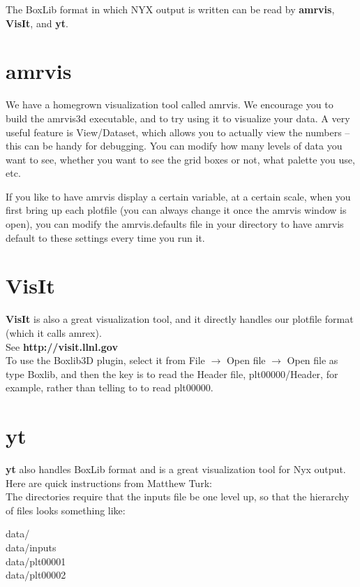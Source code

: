 The BoxLib format in which NYX output is written can be read by {\bf amrvis}, {\bf VisIt}, and {\bf yt}.

\section{amrvis}
We have a homegrown visualization tool called amrvis. We encourage you to build the amrvis3d executable, 
and to try using it to visualize your data. A very useful feature is View/Dataset, which allows you to actually 
view the numbers -- this can be handy for debugging. 
You can modify how many levels of data you want to see, whether you want to see the grid boxes or not, what palette you use, etc.

If you like to have amrvis display a certain variable, at a certain scale, when you first bring up each plotfile 
(you can always change it once the amrvis window is open), you can modify the amrvis.defaults file in your directory 
to have amrvis default to these settings every time you run it. 

\section{VisIt}
{\bf VisIt} is also a great visualization tool, and it directly handles our plotfile format (which it calls amrex).   \\

\noindent See {\bf http://visit.llnl.gov} \\

\noindent To use the Boxlib3D plugin, select it from File $\rightarrow$ Open file $\rightarrow$ Open file as type Boxlib, 
and then the key is to read the Header file, plt00000/Header, for example, rather than telling to to read plt00000.


\section{yt}

{\bf yt} also handles BoxLib format and is a great visualization tool for Nyx output.   \\

\noindent Here are quick instructions from Matthew Turk: \\

\noindent The directories require that the inputs file be one level up, so that the hierarchy of files looks something like:

\noindent data/  \\
\noindent data/inputs \\
\noindent data/plt00001 \\
\noindent data/plt00002 \\

